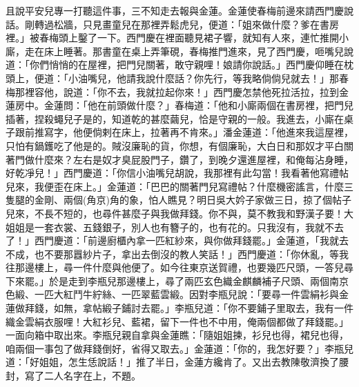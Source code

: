 且說平安兒專一打聽這件事，三不知走去報與金蓮。金蓮使春梅前邊來請西門慶說話。剛轉過松牆，只見畫童兒在那裡弄鬆虎兒，便道：「姐來做什麼？爹在書房裡。」被春梅頭上鑿了一下。西門慶在裡面聽見裙子響，就知有人來，連忙推開小廝，走在床上睡著。那書童在桌上弄筆硯，春梅推門進來，見了西門慶，咂嘴兒說道：「你們悄悄的在屋裡，把門兒關著，敢守親哩！娘請你說話。」西門慶仰睡在枕頭上，便道：「小油嘴兒，他請我說什麼話？你先行，等我略倘倘兒就去！」那春梅那裡容他，說道：「你不去，我就拉起你來！」西門慶怎禁他死拉活拉，拉到金蓮房中。金蓮問：「他在前頭做什麼？」春梅道：「他和小廝兩個在書房裡，把門兒插著，捏殺蠅兒子是的，知道乾的甚麼繭兒，恰是守親的一般。我進去，小廝在桌子跟前推寫字，他便倘剌在床上，拉著再不肯來。」潘金蓮道：「他進來我這屋裡，只怕有鍋鑊吃了他是的。賊沒廉恥的貨，你想，有個廉恥，大白日和那奴才平白關著門做什麼來？左右是奴才臭屁股門子，鑽了，到晚夕還進屋裡，和俺每沾身睡，好乾凈兒！」西門慶道：「你信小油嘴兒胡說，我那裡有此勾當！我看著他寫禮帖兒來，我便歪在床上。」金蓮道：「巴巴的關著門兒寫禮帖？什麼機密謠言，什麼三隻腿的金剛、兩個(角京)角的象，怕人瞧見？明日吳大妗子家做三日，掠了個帖子兒來，不長不短的，也尋件甚麼子與我做拜錢。你不與，莫不教我和野漢子要！大姐姐是一套衣裳、五錢銀子，別人也有簪子的，也有花的。只我沒有，我就不去了！」西門慶道：「前邊廚櫃內拿一匹紅紗來，與你做拜錢罷。」金蓮道，「我就去不成，也不要那囂紗片子，拿出去倒沒的教人笑話！」西門慶道：「你休亂，等我往那邊樓上，尋一件什麼與他便了。如今往東京送賀禮，也要幾匹尺頭，一答兒尋下來罷。」於是走到李瓶兒那邊樓上，尋了兩匹玄色織金麒麟補子尺頭、兩個南京色緞、一匹大紅鬥牛紵絲、一匹翠藍雲緞。因對李瓶兒說：「要尋一件雲絹衫與金蓮做拜錢，如無，拿帖緞子鋪討去罷。」李瓶兒道：「你不要鋪子里取去，我有一件織金雲絹衣服哩！大紅衫兒、藍裙，留下一件也不中用，俺兩個都做了拜錢罷。」一面向箱中取出來。李瓶兒親自拿與金蓮瞧：「隨姐姐揀，衫兒也得，裙兒也得，咱兩個一事包了做拜錢倒好，省得又取去。」金蓮道：「你的，我怎好要？」李瓶兒道：「好姐姐，怎生恁說話！」推了半日，金蓮方纔肯了。又出去教陳敬濟換了腰封，寫了二人名字在上，不題。

